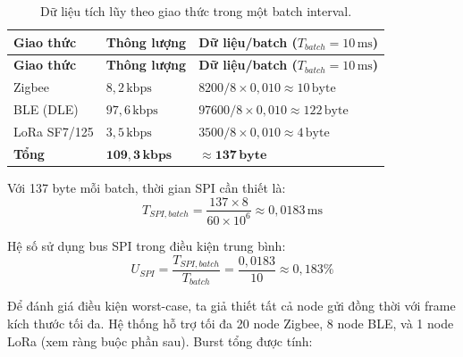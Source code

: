         \begin{longtable}{|p{3cm}|p{4cm}|p{6.5cm}|}
            \caption{Dữ liệu tích lũy theo giao thức trong một batch interval.} \label{tab:batch_data} \\
            \hline
            \textbf{Giao thức} & \textbf{Thông lượng} & \textbf{Dữ liệu/batch ($T_{batch} = 10\,\text{ms}$)} \\ \hline
            \endfirsthead
            \hline
            \textbf{Giao thức} & \textbf{Thông lượng} & \textbf{Dữ liệu/batch ($T_{batch} = 10\,\text{ms}$)} \\ \hline
            \endhead
            \hline
            \endfoot
            \endlastfoot
            Zigbee     & $8{,}2\,\text{kbps}$   & $8200 / 8 \times 0{,}010 \approx 10\,\text{byte}$   \\ \hline
            BLE (DLE)  & $97{,}6\,\text{kbps}$  & $97600 / 8 \times 0{,}010 \approx 122\,\text{byte}$ \\ \hline
            LoRa SF7/125 & $3{,}5\,\text{kbps}$ & $3500 / 8 \times 0{,}010 \approx 4\,\text{byte}$    \\ \hline
            \textbf{Tổng} & $\mathbf{109{,}3\,\text{kbps}}$ & $\mathbf{\approx 137\,\text{byte}}$ \\ \hline
        \end{longtable}
        
        Với 137 byte mỗi batch, thời gian SPI cần thiết là:
        \[ T_{SPI,batch} = \frac{137 \times 8}{60 \times 10^6} \approx 0{,}0183\,\text{ms} \]
        
        Hệ số sử dụng bus SPI trong điều kiện trung bình:
        \[ U_{SPI} = \frac{T_{SPI,batch}}{T_{batch}} = \frac{0{,}0183}{10} \approx 0{,}183\% \]
        
        Để đánh giá điều kiện worst-case, ta giả thiết tất cả node gửi đồng thời với frame kích thước tối đa. Hệ thống hỗ trợ tối đa 20 node Zigbee, 8 node BLE, và 1 node LoRa (xem ràng buộc phần sau). Burst tổng được tính:
        
